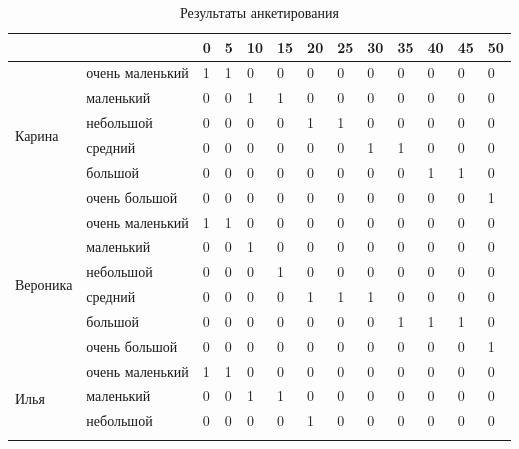     \begin{table}[!h]
    \centering
    \caption{Результаты анкетирования}
\begin{tabular}{|l|l|l|l|l|l|l|l|l|l|l|l|l|}
\hline
                          &                 & 0 & 5 & 10 & 15 & 20 & 25 & 30 & 35 & 40 & 45 & 50 \\ \hline
\multirow{6}{*}{Карина}   & очень маленький & 1 & 1 & 0  & 0  & 0  & 0  & 0  & 0  & 0  & 0  & 0  \\ \cline{2-13} 
                          & маленький       & 0 & 0 & 1  & 1  & 0  & 0  & 0  & 0  & 0  & 0  & 0  \\ \cline{2-13} 
                          & небольшой       & 0 & 0 & 0  & 0  & 1  & 1  & 0  & 0  & 0  & 0  & 0  \\ \cline{2-13} 
                          & средний         & 0 & 0 & 0  & 0  & 0  & 0  & 1  & 1  & 0  & 0  & 0  \\ \cline{2-13} 
                          & большой         & 0 & 0 & 0  & 0  & 0  & 0  & 0  & 0  & 1  & 1  & 0  \\ \cline{2-13} 
                          & очень большой   & 0 & 0 & 0  & 0  & 0  & 0  & 0  & 0  & 0  & 0  & 1  \\ \hline
\multirow{6}{*}{Вероника} & очень маленький & 1 & 1 & 0  & 0  & 0  & 0  & 0  & 0  & 0  & 0  & 0  \\ \cline{2-13} 
                          & маленький       & 0 & 0 & 1  & 0  & 0  & 0  & 0  & 0  & 0  & 0  & 0  \\ \cline{2-13} 
                          & небольшой       & 0 & 0 & 0  & 1  & 0  & 0  & 0  & 0  & 0  & 0  & 0  \\ \cline{2-13} 
                          & средний         & 0 & 0 & 0  & 0  & 1  & 1  & 1  & 0  & 0  & 0  & 0  \\ \cline{2-13} 
                          & большой         & 0 & 0 & 0  & 0  & 0  & 0  & 0  & 1  & 1  & 1  & 0  \\ \cline{2-13} 
                          & очень большой   & 0 & 0 & 0  & 0  & 0  & 0  & 0  & 0  & 0  & 0  & 1  \\ \hline
\multirow{6}{*}{Илья}     & очень маленький & 1 & 1 & 0  & 0  & 0  & 0  & 0  & 0  & 0  & 0  & 0  \\ \cline{2-13} 
                          & маленький       & 0 & 0 & 1  & 1  & 0  & 0  & 0  & 0  & 0  & 0  & 0  \\ \cline{2-13} 
                          & небольшой       & 0 & 0 & 0  & 0  & 1  & 0  & 0  & 0  & 0  & 0  & 0  \\ \cline{2-13} 

\end{tabular}
\end{table}
